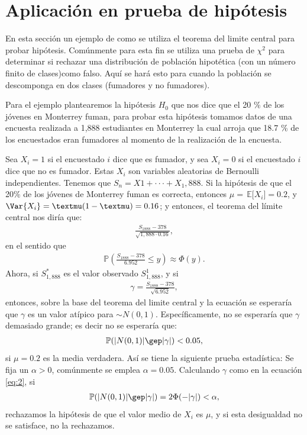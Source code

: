 \documentclass{article}
\renewcommand{\P}{\ensuremath{\mathbb{P}}}
\newcommand\espe[1]{\, \mathbb{E} \lbrack #1 \rbrack}
\begin{document}
\section{Aplicación en prueba de hipótesis } 
En esta sección un ejemplo de como se utiliza el teorema del limite central para probar hipótesis. Comúnmente para esta fin se utiliza una prueba de $\chi^2$  para determinar si rechazar una distribución de población hipotética (con un número finito de clases)como falso. Aquí se hará esto para cuando la población se descomponga en dos clases (fumadores y no fumadores).

Para el ejemplo plantearemos la hipótesis $H_0$ que nos dice que el 20 \% de los jóvenes en Monterrey fuman, para probar esta hipótesis tomamos datos de una encuesta realizada a 1,888 estudiantes en Monterrey \cite{encu} la cual arroja que 18.7 \% de los encuestados eran fumadores al momento de la realización de la encuesta.

Sea $X_i = 1$ si el encuestado $i$ dice que es fumador, y sea $X_i = 0$ si el encuestado $i$ dice que no es fumador. Estas $X_i$ son variables aleatorias de Bernoulli independientes. Tenemos que $S_n = X 1 + ··· + X_1,888$. Si la hipótesis de que el 20\% de los jóvenes de Monterrey fuman es correcta, entonces $\mu = \espe{X_i} = 0.2$, y $\Var {X_i} = µ (1 - µ) = 0.16$; y entonces, el teorema del límite central nos diría que:
\begin{align}\label{eq:1}
   \frac{S_{1888}-378}{\sqrt{1,888 \cdot 0.16}}, 
\end{align}
 en el sentido que
\begin{align}
    \P \left( \frac{S_{1888}-378}{6.952} \leq y \right)\approx \Phi(y).
\end{align}
Ahora, si $S^{*}_{1,888}$ es el valor observado $S_{1,888}^1$, y si
    \begin{align}\label{eq:2}
  \gamma= \frac{S_{1888}-378}{\sqrt{6.952}}, 
\end{align}    
entonces, sobre la base del teorema del limite central y la ecuación  se esperaría que $\gamma$ es un valor atípico para $\sim N(0,1)$. Específicamente, no se esperaría que $\gamma$ demasiado grande; es decir no se esperaría que:
\begin{align}
    \P (|N(0,1)|\gep |\gamma|)<0.05,
\end{align}
  si $\mu=0.2$ es la media verdadera.
Así se tiene la siguiente prueba estadística: Se fija un $\alpha >0$, comúnmente se emplea $\alpha =0.05$. Calculando $\gamma$ como en la ecuación \ref{eq:2}, si
\begin{align}
    \P  (|N(0,1)|\gep |\gamma|)= 2\Phi(-|\gamma|)<\alpha,
\end{align}
rechazamos la hipótesis de que el valor medio de $X_i$ es $\mu$, y si esta desigualdad no se satisface, no la rechazamos.
\end{document}
